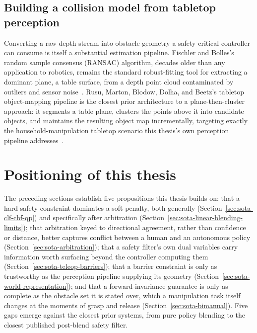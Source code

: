 \subsection{Building a collision model from tabletop perception}
\label{sec:sota-tabletop-world}

Converting a raw depth stream into obstacle geometry a safety-critical controller can consume is itself a substantial estimation pipeline. Fischler and Bolles's random sample consensus (RANSAC) algorithm, decades older than any application to robotics, remains the standard robust-fitting tool for extracting a dominant plane, a table surface, from a depth point cloud contaminated by outliers and sensor noise~\cite{fischler1981ransac}. Rusu, Marton, Blodow, Dolha, and Beetz's tabletop object-mapping pipeline is the closest prior architecture to a plane-then-cluster approach: it segments a table plane, clusters the points above it into candidate objects, and maintains the resulting object map incrementally, targeting exactly the household-manipulation tabletop scenario this thesis's own perception pipeline addresses~\cite{rusu2008tabletop}.

\section{Positioning of this thesis}
\label{sec:sota-positioning}

The preceding sections establish five propositions this thesis builds on: that a hard safety constraint dominates a soft penalty, both generally (Section~\ref{sec:sota-clf-cbf-qp}) and specifically after arbitration (Section~\ref{sec:sota-linear-blending-limits}); that arbitration keyed to directional agreement, rather than confidence or distance, better captures conflict between a human and an autonomous policy (Section~\ref{sec:sota-arbitration}); that a safety filter's own dual variables carry information worth surfacing beyond the controller computing them (Section~\ref{sec:sota-teleop-barriers}); that a barrier constraint is only as trustworthy as the perception pipeline supplying its geometry (Section~\ref{sec:sota-world-representation}); and that a forward-invariance guarantee is only as complete as the obstacle set it is stated over, which a manipulation task itself changes at the moments of grasp and release (Section~\ref{sec:sota-bimanual}). Five gaps emerge against the closest prior systems, from pure policy blending to the closest published post-blend safety filter.

